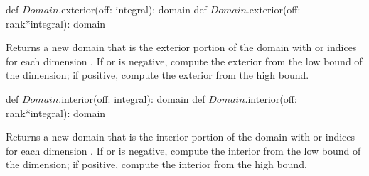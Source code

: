 \begin{protohead}
def $Domain$.exterior(off: integral): domain
def $Domain$.exterior(off: rank*integral): domain
\end{protohead}
\begin{protobody}
Returns a new domain that is the exterior portion of the domain
with  or  indices for each dimension .
If  or  is negative, compute the exterior from
the low bound of the dimension; if positive, compute the exterior from
the high bound.
\end{protobody}

\begin{protohead}
def $Domain$.interior(off: integral): domain
def $Domain$.interior(off: rank*integral): domain
\end{protohead}
\begin{protobody}
Returns a new domain that is the interior portion of the domain
with  or  indices for each dimension .
If  or  is negative, compute the interior from
the low bound of the dimension; if positive, compute the interior from
the high bound.
\end{protobody}

